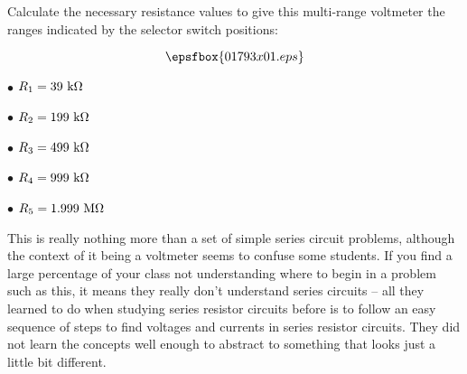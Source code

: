 

Calculate the necessary resistance values to give this multi-range voltmeter the ranges indicated by the selector switch positions:

$$\epsfbox{01793x01.eps}$$







\item{$\bullet$} $R_1 = 39 \hbox{ k} \Omega$
\item{$\bullet$} $R_2 = 199 \hbox{ k} \Omega$
\item{$\bullet$} $R_3 = 499 \hbox{ k} \Omega$
\item{$\bullet$} $R_4 = 999 \hbox{ k} \Omega$
\item{$\bullet$} $R_5 = 1.999 \hbox{ M} \Omega$







This is really nothing more than a set of simple series circuit problems, although the context of it being a voltmeter seems to confuse some students.  If you find a large percentage of your class not understanding where to begin in a problem such as this, it means they really don't understand series circuits -- all they learned to do when studying series resistor circuits before is to follow an easy sequence of steps to find voltages and currents in series resistor circuits.  They did not learn the concepts well enough to abstract to something that looks just a little bit different.




